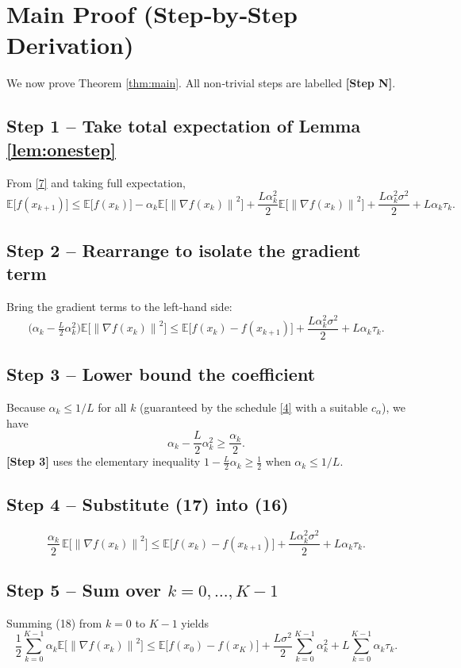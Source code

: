 \documentclass{article}
\newcommand{\EE}{\mathbb{E}}
\newcommand{\norm}[1]{\left\lVert #1\right\rVert}
\begin{document}
\section*{Main Proof (Step‑by‑Step Derivation)}
We now prove Theorem \ref{thm:main}.  
All non‑trivial steps are labelled \textbf{[Step N]}.

\subsection*{Step 1 – Take total expectation of Lemma \ref{lem:onestep}}
From \eqref{7} and taking full expectation,
\[
\EE\!\bigl[f(x_{k+1})\bigr]\le
\EE\!\bigl[f(x_{k})\bigr]
-\alpha_{k}\EE\!\bigl[\norm{\nabla f(x_{k})}^{2}\bigr]
+\frac{L\alpha_{k}^{2}}{2}\EE\!\bigl[\norm{\nabla f(x_{k})}^{2}\bigr]
+\frac{L\alpha_{k}^{2}\sigma^{2}}{2}
+L\alpha_{k}\tau_{k}.
\tag{15}
\]

\subsection*{Step 2 – Rearrange to isolate the gradient term}
Bring the gradient terms to the left-hand side:
\[
\bigl(\alpha_{k}-\tfrac{L}{2}\alpha_{k}^{2}\bigr)\EE\!\bigl[\norm{\nabla f(x_{k})}^{2}\bigr]
\le
\EE\!\bigl[f(x_{k})-f(x_{k+1})\bigr]
+\frac{L\alpha_{k}^{2}\sigma^{2}}{2}+L\alpha_{k}\tau_{k}.
\tag{16}
\]

\subsection*{Step 3 – Lower bound the coefficient}
Because $\alpha_{k}\le 1/L$ for all $k$ (guaranteed by the schedule \eqref{4} with a suitable $c_{\alpha}$), we have
\[
\alpha_{k}-\frac{L}{2}\alpha_{k}^{2}\ge \frac{\alpha_{k}}{2}.
\tag{17}
\]
\textbf{[Step 3]} uses the elementary inequality $1-\frac{L}{2}\alpha_{k}\ge \frac12$ when $\alpha_{k}\le 1/L$.

\subsection*{Step 4 – Substitute (17) into (16)}
\[
\frac{\alpha_{k}}{2}\,\EE\!\bigl[\norm{\nabla f(x_{k})}^{2}\bigr]
\le
\EE\!\bigl[f(x_{k})-f(x_{k+1})\bigr]
+\frac{L\alpha_{k}^{2}\sigma^{2}}{2}+L\alpha_{k}\tau_{k}.
\tag{18}
\]

\subsection*{Step 5 – Sum over $k=0,\dots ,K-1$}
Summing (18) from $k=0$ to $K-1$ yields
\[
\frac12\sum_{k=0}^{K-1}\alpha_{k}\EE\!\bigl[\norm{\nabla f(x_{k})}^{2}\bigr]
\le
\EE\!\bigl[f(x_{0})-f(x_{K})\bigr]
+\frac{L\sigma^{2}}{2}\sum_{k=0}^{K-1}\alpha_{k}^{2}
+L\sum_{k=0}^{K-1}\alpha_{k}\tau_{k}.
\tag{19}
\]
\end{document}
